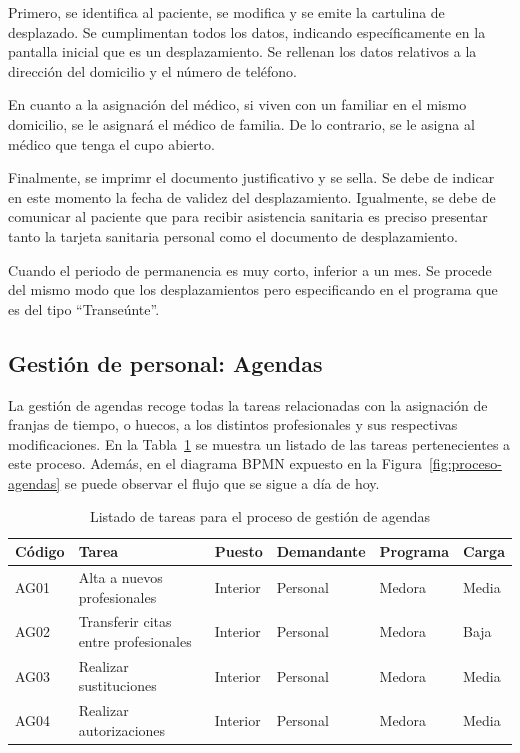 Primero, se identifica al paciente, se modifica y se emite la cartulina de desplazado.
Se cumplimentan todos los datos, indicando específicamente en la pantalla inicial que es un desplazamiento.
Se rellenan los datos relativos a la dirección del domicilio y el número de teléfono.

En cuanto a la asignación del médico, si viven con un familiar en el mismo domicilio, se le asignará el médico de familia.
De lo contrario, se le asigna al médico que tenga el cupo abierto.

Finalmente, se imprimr el documento justificativo y se sella.
Se debe de indicar en este momento la fecha de validez del desplazamiento.
Igualmente, se debe de comunicar al paciente que para recibir asistencia sanitaria es preciso presentar tanto la tarjeta sanitaria personal como el documento de desplazamiento.

Cuando el periodo de permanencia es muy corto, inferior a un mes.
Se procede del mismo modo que los desplazamientos pero especificando en el programa que es del tipo ``Transeúnte''.

\subsection{Gestión de personal: Agendas}

La gestión de agendas recoge todas la tareas  relacionadas con la asignación de franjas de tiempo, o huecos, a los distintos profesionales y sus respectivas modificaciones. En la Tabla~\ref{tab:proceso-agendas} se muestra un listado de las tareas pertenecientes a este proceso. Además, en el diagrama BPMN expuesto en la Figura~\ref{fig:proceso-agendas} se puede observar el flujo que se sigue a día de hoy.

\begin{table}[H]
    \begin{tabular}{lp{5cm}llll}
        \toprule
        Código & Tarea                                & Puesto   & Demandante & Programa & Carga \\
        \midrule
        AG01   & Alta a nuevos profesionales          & Interior & Personal   & Medora   & Media \\
        AG02   & Transferir citas entre profesionales & Interior & Personal   & Medora   & Baja  \\
        AG03   & Realizar sustituciones               & Interior & Personal   & Medora   & Media \\
        AG04   & Realizar autorizaciones              & Interior & Personal   & Medora   & Media \\
        \bottomrule
    \end{tabular}
    \caption{Listado de tareas para el proceso de gestión de agendas}
    \label{tab:proceso-agendas}
\end{table}

